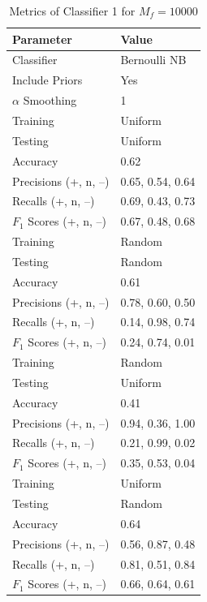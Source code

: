 \documentclass[11pt]{article}
\begin{document}
\begin{table}[!h]
	\begin{center}
		\begin{tabular}{|l|l|}			
			\hline
			Parameter & Value \\
			\hline\hline
			Classifier & Bernoulli NB \\
			Include Priors & Yes \\
			$\alpha$ Smoothing & 1 \\
			\hline\hline
			Training & Uniform \\
			Testing & Uniform \\
			\hline
			Accuracy & 0.62 \\
			Precisions (+, n, --) &  0.65, 0.54, 0.64 \\
			Recalls (+, n, --) & 0.69, 0.43, 0.73 \\
			$F_1$ Scores (+, n, --) & 0.67, 0.48, 0.68 \\
			\hline\hline
			Training & Random \\
			Testing & Random \\
			\hline
			Accuracy & 0.61 \\
			Precisions (+, n, --) &  0.78, 0.60, 0.50 \\
			Recalls (+, n, --) & 0.14, 0.98, 0.74 \\
			$F_1$ Scores (+, n, --) & 0.24, 0.74, 0.01 \\
			\hline\hline
			Training & Random \\
			Testing & Uniform \\
			\hline
			Accuracy & 0.41 \\
			Precisions (+, n, --) &  0.94, 0.36, 1.00 \\
			Recalls (+, n, --) & 0.21, 0.99, 0.02 \\
			$F_1$ Scores (+, n, --) & 0.35, 0.53, 0.04 \\
			\hline\hline
			Training & Uniform \\
			Testing & Random \\
			\hline
			Accuracy & 0.64 \\
			Precisions (+, n, --) &  0.56, 0.87, 0.48 \\
			Recalls (+, n, --) & 0.81, 0.51, 0.84 \\
			$F_1$ Scores (+, n, --) & 0.66, 0.64, 0.61 \\
			\hline
		\end{tabular}
		\caption{Metrics of Classifier 1 for $M_f = 10000$}
		\label{tbl:metrics-1st10000}
	\end{center}
\end{table}
\end{document}
